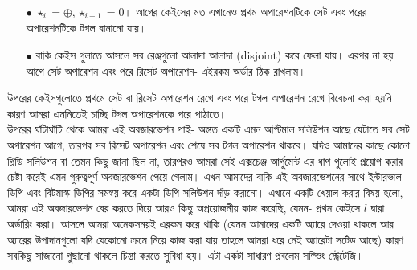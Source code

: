 \begin{solution}
\begin{itemize}
  \item[$\bullet$] $\star_i = \oplus, \star_{i+1} = 0$। আগের কেইসের মত এখানেও প্রথম অপারেশনটিকে সেট এবং পরের অপারেশনটিকে টগল বানানো যায়।
  \item[$\bullet$] বাকি কেইস গুলাতে আসলে সব রেঞ্জগুলো আলাদা আলাদা (disjoint) করে ফেলা যায়। এরপর না হয় আগে সেট অপারেশন এবং পরে রিসেট অপারেশন- এইরকম অর্ডার ঠিক রাখলাম।
\end{itemize}
উপরের কেইসগুলোতে প্রথমে সেট বা রিসেট অপারেশন রেখে এবং পরে টগল অপারেশন রেখে বিবেচনা করা হয়নি কারণ আমরা এমনিতেই চাচ্ছি টগল অপারেশনকে পরে পাঠাতে।\\
উপরের ঘাঁটাঘাঁটি থেকে আমরা এই অবজারভেশন পাই- অন্তত একটি এমন অপ্টিমাল সলিউশন আছে যেটাতে সব সেট অপারেশন আগে, তারপর সব রিসেট অপারেশন এবং শেষে সব টগল অপারেশন থাকবে। যদিও আমাদের কাছে কোনো গ্রিডি সলিউশন বা তেমন কিছু জানা ছিল না, তারপরও আমরা সেই এক্সচেঞ্জ আর্গুমেন্ট এর ধাপ গুলোই প্রয়োগ করার চেষ্টা করেই এমন গুরুত্বপূর্ণ অবজারভেশন পেয়ে গেলাম। এখন আমাদের বাকি এই অবজারভেশনের সাথে ইন্টারভাল ডিপি এবং বিটমাস্ক ডিপির সমন্বয় করে একটা ডিপি সলিউশন দাঁড় করানো। এখানে একটি খেয়াল করার বিষয় হলো, আমরা এই অবজারভেশন বের করতে দিয়ে আরও কিছু অপ্রয়োজনীয় কাজ করেছি, যেমন- প্রথম কেইসে $l$ দ্বারা অর্ডারিং করা। আসলে আমরা অনেকসময়ই এরকম করে থাকি (যেমন আমাদের একটি অ্যারে দেওয়া থাকলে আর অ্যারের উপাদানগুলো যদি যেকোনো ক্রমে নিয়ে কাজ করা যায় তাহলে আমরা ধরে নেই অ্যারেটা সর্টেড আছে) কারণ সবকিছু সাজানো গুছানো থাকলে চিন্তা করতে সুবিধা হয়। এটা একটা সাধারণ প্রবলেম সল্ভিং স্ট্রেটেজি।

\end{solution}
